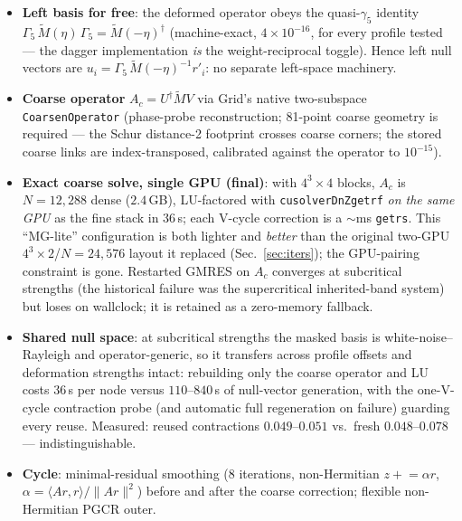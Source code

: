 \documentclass[11pt]{article}
\newcommand{\Mt}{\widetilde{M}}
\begin{document}
\begin{itemize}
\item \textbf{Left basis for free}: the deformed operator obeys the
quasi-$\gamma_5$ identity
$\Gamma_5\,\Mt(\eta)\,\Gamma_5=\Mt(-\eta)^\dagger$ (machine-exact,
$4\times10^{-16}$, for every profile tested --- the dagger implementation
\emph{is} the weight-reciprocal toggle).  Hence left null vectors are
$u_i=\Gamma_5\,\Mt(-\eta)^{-1}r'_i$: no separate left-space machinery.
\item \textbf{Coarse operator} $A_c=U^\dagger \Mt V$ via Grid's native
two-subspace \texttt{CoarsenOperator} (phase-probe reconstruction;
81-point coarse geometry is required --- the Schur distance-2 footprint
crosses coarse corners; the stored coarse links are index-transposed,
calibrated against the operator to $10^{-15}$).
\item \textbf{Exact coarse solve, single GPU (final)}: with
$4^3\times4$ blocks, $A_c$ is $N=12{,}288$ dense ($2.4$\,GB), LU-factored
with \texttt{cusolverDnZgetrf} \emph{on the same GPU} as the fine stack
in $36$\,s; each V-cycle correction is a $\sim$ms \texttt{getrs}.  This
``MG-lite'' configuration is both lighter and \emph{better} than the
original two-GPU $4^3\times2$/$N{=}24{,}576$ layout it replaced
(Sec.~\ref{sec:iters}); the GPU-pairing constraint is gone.  Restarted
GMRES on $A_c$ converges at subcritical strengths (the historical
failure was the supercritical inherited-band system) but loses on
wallclock; it is retained as a zero-memory fallback.
\item \textbf{Shared null space}: at subcritical strengths the masked
basis is white-noise--Rayleigh and operator-generic, so it transfers
across profile offsets and deformation strengths intact: rebuilding
only the coarse operator and LU costs $36$\,s per node versus
$110$--$840$\,s of null-vector generation, with the one-V-cycle
contraction probe (and automatic full regeneration on failure) guarding
every reuse.  Measured: reused contractions $0.049$--$0.051$ vs.\ fresh
$0.048$--$0.078$ --- indistinguishable.
\item \textbf{Cycle}: minimal-residual smoothing (8 iterations,
non-Hermitian $z\mathrel{+}=\alpha r$, $\alpha=\langle Ar,r\rangle/\|Ar\|^2$)
before and after the coarse correction; flexible non-Hermitian PGCR
outer.
\end{itemize}
\end{document}
